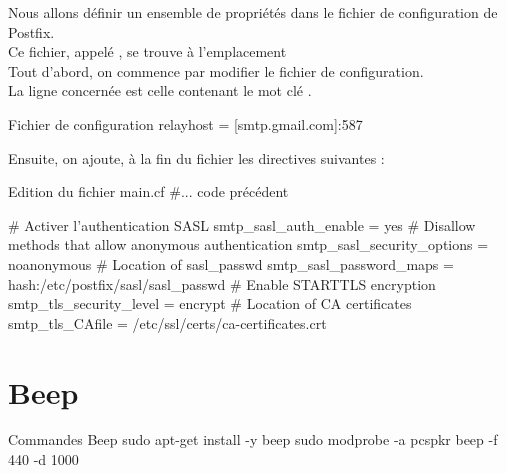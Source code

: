 Nous allons définir un ensemble de propriétés dans le fichier de configuration de Postfix. \\
Ce fichier, appelé , se trouve à l'emplacement  \\

Tout d'abord, on commence par modifier le fichier de configuration. \\
La ligne concernée est celle contenant le mot clé .


\begin{Bash}{Fichier de configuration }
relayhost = [smtp.gmail.com]:587
\end{Bash}


Ensuite, on ajoute, à la fin du fichier les directives suivantes : \\
\begin{Bash}{Edition du fichier main.cf}
#... code précédent

# Activer l'authentication SASL
smtp_sasl_auth_enable = yes
# Disallow methods that allow anonymous authentication
smtp_sasl_security_options = noanonymous
# Location of sasl_passwd
smtp_sasl_password_maps = hash:/etc/postfix/sasl/sasl_passwd
# Enable STARTTLS encryption
smtp_tls_security_level = encrypt
# Location of CA certificates
smtp_tls_CAfile = /etc/ssl/certs/ca-certificates.crt
\end{Bash}

\chapter{Beep}

\begin{Bash}{Commandes Beep}
sudo apt-get install -y beep
sudo modprobe -a pcspkr
beep -f 440 -d 1000
\end{Bash}


